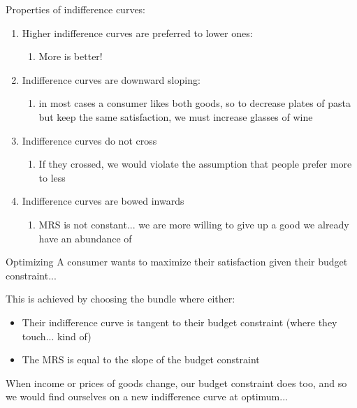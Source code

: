 \documentclass[compress]{beamer}
\begin{document}
\begin{frame}{Properties of indifference curves:}
    \begin{enumerate}
        \item Higher indifference curves are preferred to lower ones: 
        \begin{enumerate}
            \item More is better!
        \end{enumerate}
        \item Indifference curves are downward sloping: 
        \begin{enumerate}
            \item in most cases a consumer likes both goods, so to decrease plates of pasta but keep the same satisfaction, we must increase glasses of wine
        \end{enumerate}
    \item Indifference curves do not cross
    \begin{enumerate}
        \item If they crossed, we would violate the assumption that people prefer more to less
    \end{enumerate}
    \item Indifference curves are bowed inwards
    \begin{enumerate}
        \item MRS is not constant... we are more willing to give up a good we already have an abundance of
    \end{enumerate}
    \end{enumerate}
\end{frame}

\begin{frame}{Optimizing}
A consumer wants to maximize their satisfaction given their budget constraint... 

\begin{block}{This is achieved by choosing the bundle where either:}
    \begin{itemize}
        \item Their indifference curve is tangent to their budget constraint (where they touch... kind of)
        \item The MRS is equal to the slope of the budget constraint
    \end{itemize}
\end{block}

When income or prices of goods change, our budget constraint does too, and so we would find ourselves on a new indifference curve at optimum... 
\end{frame}
\end{document}
